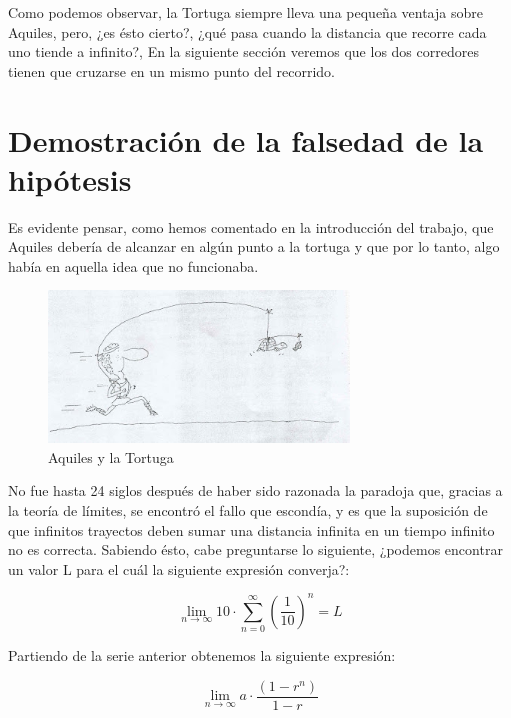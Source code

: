 \documentclass[a4paper,12pt]{article}
\begin{document}
   Como podemos observar, la Tortuga siempre lleva una pequeña ventaja sobre Aquiles, pero, ¿es ésto cierto?,
   ¿qué pasa cuando la distancia que recorre cada uno tiende a infinito?, 
   En la siguiente sección veremos que los dos corredores tienen que cruzarse en un mismo punto del recorrido.
   
   \section{Demostración de la falsedad de la hipótesis}
   
   Es evidente pensar, como hemos comentado en la introducción del trabajo, que Aquiles
   debería de alcanzar en algún punto a la tortuga y que por lo tanto, algo había
   en aquella idea que no funcionaba. 
   
   \begin{figure}[h]
   \begin{center}
   \includegraphics[width=8cm]{Imagenes/aquiles-tortuga.jpg}
   \end{center}
   \caption{Aquiles y la Tortuga}
   \label{fig:aquiles}
   \end{figure} 
    
   \newpage
   
   No fue hasta 24 siglos después de haber sido razonada la paradoja que, 
   gracias a la teoría de límites, se encontró el fallo que escondía,
   y es que la suposición de que infinitos trayectos deben sumar una distancia infinita en 
   un tiempo infinito no es correcta. Sabiendo ésto, cabe preguntarse lo siguiente,      
   ¿podemos encontrar un valor L para el cuál la siguiente expresión converja?: 
   
   \begin{equation}
   \lim\limits_{n \rightarrow \infty} 10 \cdot \sum_{n=0}^\infty (\frac{1}{10})^n = L
   \end{equation}   
   
   Partiendo de la serie anterior obtenemos la siguiente expresión:
   
   \begin{equation}
   \lim\limits_{n \rightarrow \infty} a \cdot \frac{(1 - r^n)}{1 - r}
   \end{equation}
   
\end{document}
